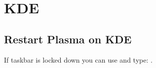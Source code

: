 \section{KDE}
\subsection{Restart Plasma on KDE}
If taskbar is locked down you can use  and type: 
.
